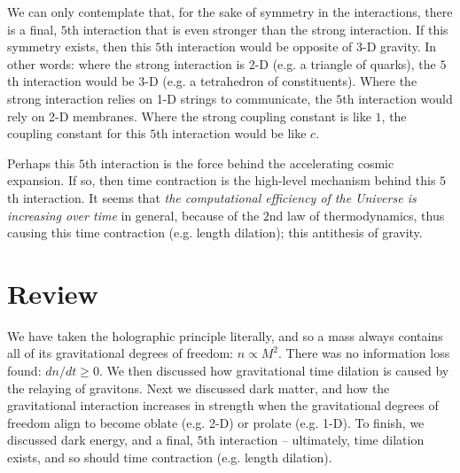 \documentclass[12pt]{article}
\begin{document}
{We can only contemplate that, for the sake of symmetry in the interactions, there is a final, $5$th interaction that is even stronger than the strong interaction.
If this symmetry exists, then this $5$th interaction would be opposite of 3-D gravity.
In other words: where the strong interaction is 2-D (e.g. a triangle of quarks), the $5$th interaction would be 3-D (e.g. a tetrahedron of constituents).
Where the strong interaction relies on 1-D strings to communicate, the $5$th interaction would rely on 2-D membranes.
Where the strong coupling constant is like $1$, the coupling constant for this $5$th interaction would be like $c$.

Perhaps this $5$th interaction is the force behind the accelerating cosmic expansion.
If so, then time contraction is the high-level mechanism behind this $5$th interaction.
It seems that {\textit{the computational efficiency of the Universe is increasing over time}} in general, because of the $2$nd law of thermodynamics, thus causing this time contraction (e.g. length dilation); this antithesis of gravity.






\section{Review}

We have taken the holographic principle literally, and so a mass always contains all of its gravitational degrees of freedom: $n \propto M^2$.
There was no information loss found: $dn/dt \geq 0$.
We then discussed how gravitational time dilation is caused by the relaying of gravitons.
Next we discussed dark matter, and how the gravitational interaction increases in strength when the gravitational degrees of freedom align to become oblate (e.g. 2-D) or prolate (e.g. 1-D).
To finish, we discussed dark energy, and a final, $5$th interaction -- ultimately, time dilation exists, and so should time contraction (e.g. length dilation).

}
\end{document}
